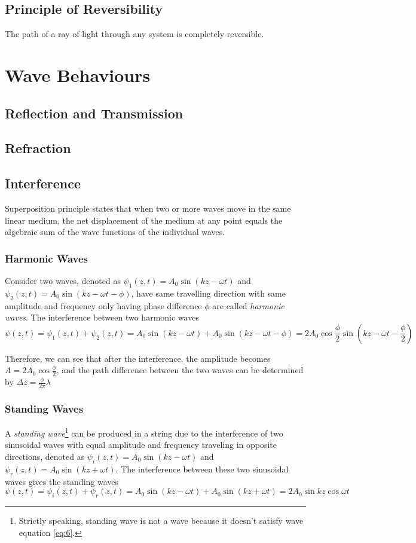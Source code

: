 \documentclass[openany]{book}
\begin{document}
\subsection{Principle of Reversibility}
The path of a ray of light through any
system is completely reversible.

\section{Wave Behaviours}
\subsection{Reflection and Transmission}
\subsection{Refraction}
\subsection{Interference}
Superposition principle states that when two or more waves move in the same linear medium, the net displacement of the medium at any point equals the algebraic sum of the wave functions of the individual waves.
\subsubsection{Harmonic Waves}
Consider two waves, denoted as $\psi _1(z,t)=A_0\sin (kz-\omega t)$ and $\psi _2(z,t)=A_0\sin (kz-\omega t -\phi)$, have same travelling direction with same amplitude and frequency only having phase difference $\phi $ are called \emph{harmonic waves}. The interference between two harmonic waves
\[\psi (z,t)=\psi _1(z,t)+\psi _2(z,t)=A_0\sin (kz-\omega t)+A_0\sin (kz-\omega t -\phi)=2A_0\cos \frac{\phi }{2}\sin (kz-\omega t-\frac{\phi }{2})\]

Therefore, we can see that after the interference, the amplitude becomes $A=2A_0\cos \frac{\phi }{2}$, and the path difference between the two waves can be determined by $\Delta z=\frac{\phi}{2\pi}\lambda $
\subsubsection{Standing Waves}
A \emph{standing wave}\footnote{Strictly speaking, standing wave is not a wave because it doesn't satisfy wave equation \eqref{eq:6}.} can be produced in a string due to the interference of two sinusoidal waves with equal amplitude and frequency traveling in opposite directions, denoted as $\psi _i(z,t)=A_0\sin (kz-\omega t)$ and $\psi _r(z,t)=A_0\sin (kz+\omega t)$. The interference between these two sinusoidal waves gives the standing waves
\[\psi (z,t)=\psi _i(z,t)+\psi _r(z,t)=A_0\sin (kz-\omega t)+A_0\sin (kz+\omega t)=2A_0\sin kz\cos \omega t \]
\end{document}
